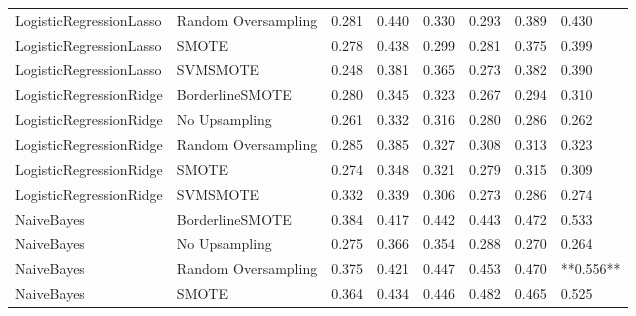 \begin{tabular}{llllllll}
     LogisticRegressionLasso & Random Oversampling & 0.281 &                     0.440 &                 0.330 &                  0.293 &                                   0.389 &     0.430 \\
     LogisticRegressionLasso &               SMOTE & 0.278 &                     0.438 &                 0.299 &                  0.281 &                                   0.375 &     0.399 \\
     LogisticRegressionLasso &            SVMSMOTE & 0.248 &                     0.381 &                 0.365 &                  0.273 &                                   0.382 &     0.390 \\
     LogisticRegressionRidge &     BorderlineSMOTE & 0.280 &                     0.345 &                 0.323 &                  0.267 &                                   0.294 &     0.310 \\
     LogisticRegressionRidge &       No Upsampling & 0.261 &                     0.332 &                 0.316 &                  0.280 &                                   0.286 &     0.262 \\
     LogisticRegressionRidge & Random Oversampling & 0.285 &                     0.385 &                 0.327 &                  0.308 &                                   0.313 &     0.323 \\
     LogisticRegressionRidge &               SMOTE & 0.274 &                     0.348 &                 0.321 &                  0.279 &                                   0.315 &     0.309 \\
     LogisticRegressionRidge &            SVMSMOTE & 0.332 &                     0.339 &                 0.306 &                  0.273 &                                   0.286 &     0.274 \\
                  NaiveBayes &     BorderlineSMOTE & 0.384 &                     0.417 &                 0.442 &                  0.443 &                                   0.472 &     0.533 \\
                  NaiveBayes &       No Upsampling & 0.275 &                     0.366 &                 0.354 &                  0.288 &                                   0.270 &     0.264 \\
                  NaiveBayes & Random Oversampling & 0.375 &                     0.421 &                 0.447 &                  0.453 &                                   0.470 & **0.556** \\
                  NaiveBayes &               SMOTE & 0.364 &                     0.434 &                 0.446 &                  0.482 &                                   0.465 &     0.525 \\

\end{tabular}

